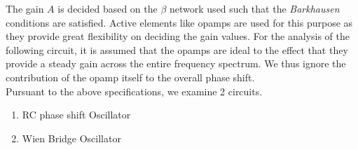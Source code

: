 \documentclass[12pt]{report}
\begin{document}
\begin{large}
The gain $A$ is decided based on the $\beta$ network used such that the \textit{Barkhausen} conditions are satisfied. Active elements like opamps are used for this purpose as they provide great flexibility on deciding the gain values. For the analysis of the following circuit, it is assumed that the opamps are ideal to the effect that they provide a steady gain across the entire frequency spectrum. We thus ignore the contribution of the opamp itself to the overall phase shift.\\

Pursuant to the above specifications, we examine 2 circuits.
\begin{enumerate}[noitemsep]
    \item RC phase shift Oscillator
    \item Wien Bridge Oscillator
\end{enumerate}
\end{large}
\end{document}
